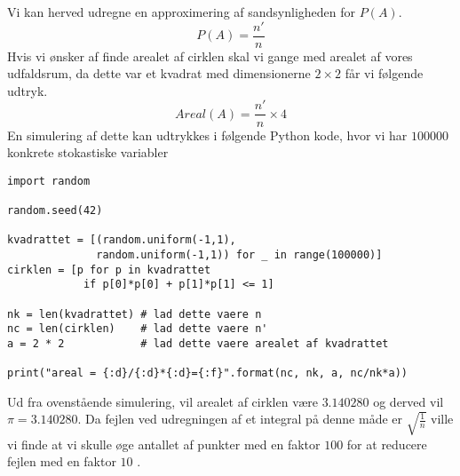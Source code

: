 \documentclass[../../SRP.tex]{subfiles}
\begin{document}
\begin{center}
\end{center}

Vi kan herved udregne en approximering af sandsynligheden for $P(A)$.
\begin{equation}
  P(A) = \frac{n'}{n}
\end{equation}
Hvis vi ønsker af finde arealet af cirklen skal vi gange med arealet af vores udfaldsrum, da dette var et kvadrat med dimensionerne $2 \times 2$ får vi følgende udtryk.
\begin{equation}
  Areal(A) = \frac{n'}{n} \times 4
\end{equation}
En simulering af dette kan udtrykkes i følgende Python kode, hvor vi har $100000$ konkrete stokastiske variabler \\

\begin{lstlisting}
import random

random.seed(42)

kvadrattet = [(random.uniform(-1,1), 
              random.uniform(-1,1)) for _ in range(100000)]
cirklen = [p for p in kvadrattet
            if p[0]*p[0] + p[1]*p[1] <= 1]

nk = len(kvadrattet) # lad dette vaere n
nc = len(cirklen)    # lad dette vaere n'
a = 2 * 2            # lad dette vaere arealet af kvadrattet

print("areal = {:d}/{:d}*{:d}={:f}".format(nc, nk, a, nc/nk*a))
\end{lstlisting}
Ud fra ovenstående simulering, vil arealet af cirklen være $3.140280$ og derved vil $\pi = 3.140280$. Da fejlen ved udregningen af et integral på denne måde er $\sqrt{\frac{1}{n}}$ ville vi finde at vi skulle øge antallet af punkter med en faktor $100$ for at reducere fejlen med en faktor $10$ \cite{SBM}. \\
\end{document}
